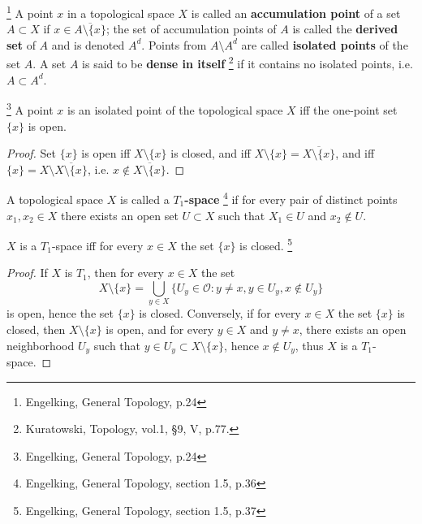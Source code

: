 \begin{definition}
\footnote{Engelking, General Topology, p.24}
A point $x$ in a topological space $X$ is called an 
\textbf{accumulation point} 
of a set $A\subset X$ if $x\in \overline{A\setminus \{x\}}$; 
the set of accumulation points of $A$ is called the 
\textbf{derived set} 
of $A$ and is denoted $A^d$. 
Points from $A\setminus A^d$ are called 
\textbf{isolated points} 
of the set $A$. 
A set $A$ is said to be 
\textbf{dense in itself}  
\footnote{Kuratowski, Topology, vol.1, \S 9, V, p.77.}
if it contains no isolated points, i.e. $A\subset A^d$.
\end{definition}

\begin{proposition} \label{P:isolat}
\footnote{Engelking, General Topology, p.24}
A point $x$ is an isolated point of the topological space $X$ iff the one-point
set $\{x\}$ is open.
\end{proposition}
\begin{proof}
Set $\{x\}$ is open iff $X\setminus\{x\}$ is closed, and iff 
$X\setminus\{x\} =\overline{ X\setminus\{x\} }$, and iff 
$\{x\}=X\setminus \overline{ X\setminus\{x\} }$, i.e. 
$x\notin\overline{ X\setminus\{x\} }$.
\end{proof}

\begin{definition} 
A topological space $X$ is called a 
\textbf{$T_1$-space} 
\footnote{Engelking, General Topology, section 1.5, p.36}
if for every pair of distinct points $x_1,x_2\in X$ there exists an open set
$U\subset X$ such that $X_1\in U$ and $x_2\notin U$.
\end{definition} 

\begin{proposition} \label{P:T1}
$X$ is a $T_1$-space iff for every $x\in X$ the set $\{x\}$ is closed.
\footnote{Engelking, General Topology, section 1.5, p.37}
\end{proposition}
\begin{proof}
If $X$ is $T_1$, then for every $x\in X$ the set
\[
  X\setminus\{x\} 
  = \bigcup_{y\in X} \{ U_y\in \mathcal{O}: y\neq x, y\in U_y, x\notin U_y \}
\]
is open, hence the set $\{x\}$ is closed.
Conversely, if for every $x\in X$ the set $\{x\}$ is closed, then
$X\setminus\{x\}$ is open, and for every $y\in X$ and $y\neq x$, there exists an
open neighborhood $U_y$ such that $y\in U_y\subset X\setminus\{x\}$, hence
$x\notin U_y$, thus $X$ is a $T_1$-space.
\end{proof}

